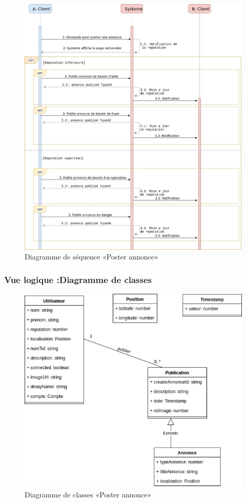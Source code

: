 \documentclass[11pt,a4paper,oneside]{book}
\begin{document}
				\begin{figure}[H]
					\centering
					\includegraphics[width=1.15\textwidth]{"Images/ch3/_Poster Annonce"}
					\caption{Diagramme de séquence «Poster annonce»}
					\label{fig:poster-annonce}
				\end{figure}
				\subsubsection{Vue logique :Diagramme de classes}
				\begin{figure}[H]
					\centering
					\includegraphics[width=1\textwidth]{Images/ch3/classePosterAnnonce}
					\caption{ Diagramme de classes «Poster annonce»}
					\label{fig:classeposterannonce}
				\end{figure}
\end{document}
